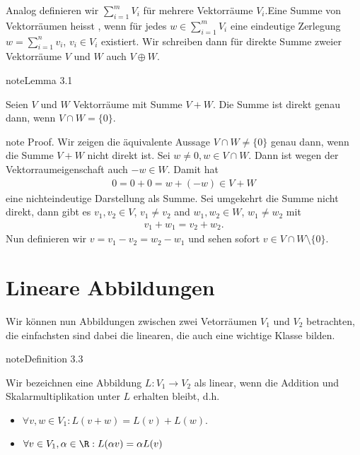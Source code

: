 \documentclass[letterpaper,10pt,english]{jupyterBook}
\begin{document}
Analog definieren wir \(\sum_{i=1}^m V_i\) für mehrere Vektorräume   \(V_i\).Eine Summe von Vektorräumen heisst , wenn für jedes \(w \in \sum_{i=1}^m V_i\) eine eindeutige Zerlegung\(w=\sum_{i=1}^n v_i\), \(v_i \in V_i\) existiert. Wir schreiben dann für direkte Summe zweier Vektorräume \(V\) und \(W\) auch \(V \oplus W\).
\label{vektorraeume/vektorraeume:lemma-13}
\begin{sphinxadmonition}{note}{Lemma 3.1}



Seien \(V\) und \(W\) Vektorräume mit Summe \(V+W\). Die Summe ist direkt genau dann, wenn \(V \cap W = \{0\}\).
\end{sphinxadmonition}

\begin{sphinxadmonition}{note}
Proof.  Wir zeigen die äquivalente Aussage \(V \cap W \neq \{0\}\) genau dann, wenn die Summe \(V+W\) nicht direkt ist. Sei \(w \neq 0, w \in V \cap W\). Dann ist wegen der Vektorraumeigenschaft auch \(-w \in W\). Damit hat
\begin{equation*}
\begin{split} 0  = 0 + 0 = w + (-w) \in V + W\end{split}
\end{equation*}
eine nichteindeutige Darstellung als Summe. Sei umgekehrt die Summe nicht direkt, dann gibt es \(v_1,v_2 \in V\), \(v_1 \neq v_2\) and \(w_1, w_2 \in W\), \(w_1 \neq w_2\) mit
\begin{equation*}
\begin{split} v_1 + w_1 = v_2 + w_2.\end{split}
\end{equation*}
Nun definieren wir \(v = v_1-v_2 = w_2 -w_1\) und sehen sofort \(v \in V\cap W \setminus\{0\}\).
\end{sphinxadmonition}


\section{Lineare Abbildungen}
\label{\detokenize{vektorraeume/LineareAbb:lineare-abbildungen}}\label{\detokenize{vektorraeume/LineareAbb::doc}}
Wir können nun Abbildungen zwischen zwei Vetorräumen \(V_1\) und \(V_2\) betrachten, die einfachsten sind dabei die linearen, die auch eine wichtige Klasse bilden.
\label{vektorraeume/LineareAbb:definition-0}
\begin{sphinxadmonition}{note}{Definition 3.3}



Wir bezeichnen eine Abbildung \(L: V_1 \rightarrow V_2\) als linear, wenn die Addition und Skalarmultiplikation unter \(L\) erhalten bleibt, d.h.
\begin{itemize}
\item {} 
\(\forall v,w \in V_1: L(v+w) = L(v) + L(w).\)

\item {} 
\(\forall v \in V_1, \alpha \in \R: L(\alpha v) = \alpha L(v)\)

\end{itemize}
\end{sphinxadmonition}
\end{document}
